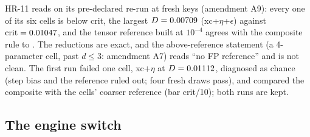 HR-11 reads  on its pre-declared re-run at fresh keys (amendment A9): every
one of its six cells is below crit, the largest
$D=\verify{tests/acceptance/results/multi_004.json}{cells[4].D}{.3g}{0.00709}$ (xc+$\eta$+$\epsilon$) against
${\rm crit}=\verify{tests/acceptance/results/multi_004.json}{cells[4].crit}{.4g}{0.01047}$, and the tensor reference built at
$10^{-4}$ agrees with the composite rule to . The reductions
are exact, and the above-reference statement (a 4-parameter cell, past $d\le3$: amendment A7) reads ``no FP
reference'' and is not clean. The first run failed one cell, xc+$\eta$ at
$D=\verify{specs/004-samplers/review/evidence/multi_004_first_252ad3a.json}{cells[0].D}{.4g}{0.01112}$, diagnosed as chance (step bias and the reference ruled out;
four fresh draws pass), and compared the composite with the cells' coarser reference (bar crit/10); both runs are
kept.

\subsection{The engine switch}\label{sec:lgv-switch}

